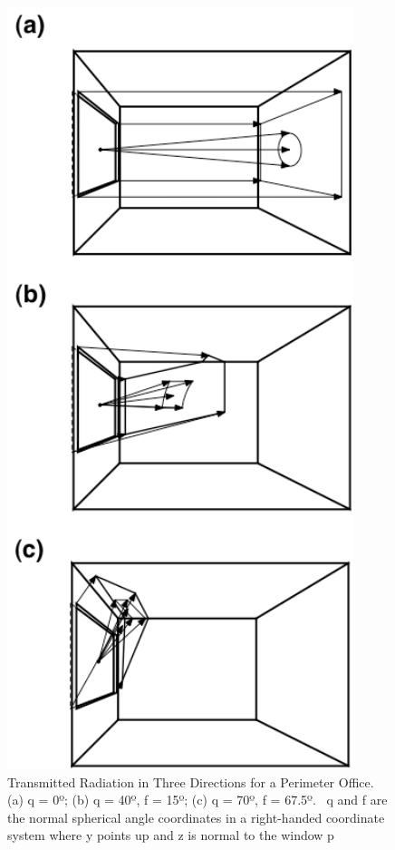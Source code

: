 \begin{figure}[hbtp] %
\centering
\includegraphics[width=0.9\textwidth, height=0.9\textheight, keepaspectratio=true]{media/image1326.png}
\caption{Transmitted Radiation in Three Directions for a Perimeter Office.  (a) q = 0º; (b) q = 40º, f = 15º; (c) q = 70º, f = 67.5º.  q and f are the normal spherical angle coordinates in a right-handed coordinate system where y points up and z is normal to the window p \protect \label{fig:transmitted-radiation-in-three-directions-for}}
\end{figure}

